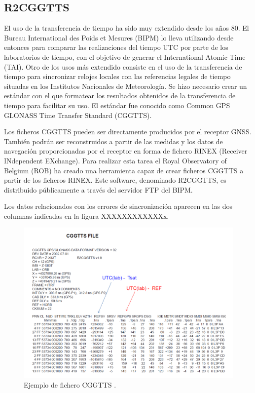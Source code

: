 \subsection{R2CGGTTS}
El uso de la transferencia de tiempo ha sido muy extendido desde los años 80. El Bureau International des Poids et Mesures (BIPM) lo lleva utilizando desde entonces para comparar las realizaciones del tiempo UTC por parte de los laboratorios de tiempo, con el objetivo de generar el International Atomic Time (TAI). Otro de los usos más extendido consiste en el uso de la transferencia de tiempo para sincronizar relojes locales con las referencias legales de tiempo situadas en los Institutos Nacionales de Meteorología. Se hizo necesario crear un estándar con el que formatear los resultados obtenidos de la transferencia de tiempo para facilitar su uso. El estándar fue conocido como Common GPS GLONASS Time Transfer Standard (CGGTTS). \newline

Los ficheros CGGTTS pueden ser directamente producidos por el receptor GNSS. También podrán ser reconstruidos a partir de las medidas y los datos de navegación proporcionadas por el receptor en forma de fichero RINEX (Receiver INdependent EXchange). Para realizar esta tarea el Royal Observatory of Belgium (ROB) ha creado una herramienta capaz de crear ficheros CGGTTS a partir de los ficheros RINEX. Este software, denominado R2CGGTTS, es distribuido públicamente a través del servidor FTP del BIPM. \newline

Los datos relacionados con los errores de sincronización aparecen en las dos columnas indicadas en la figura XXXXXXXXXXXXx.\newline

\begin{figure}[H]
	\centering
	\includegraphics[width=1\textwidth]{imagenes/cggtts.PNG}
	\caption{\label{fig1}Ejemplo de fichero CGGTTS \cite{timetransfer}.}
\end{figure}




